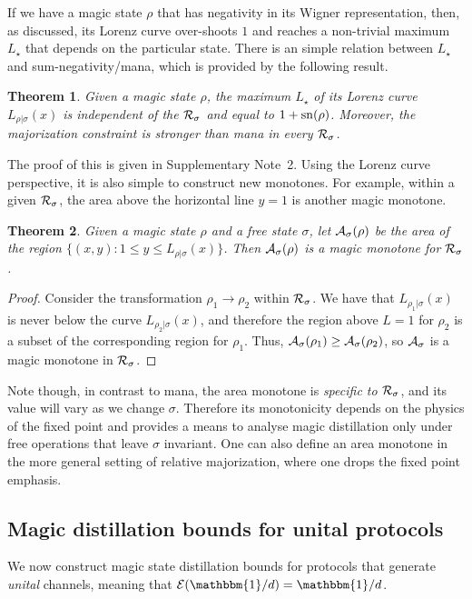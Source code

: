 \documentclass[
onecolumn,
superscriptaddress
]{revtex4-1}
\newtheorem{theorem}{Theorem}
\def\id{\mathbbm{1}}
\def\A{{\cal A}}
\def\E{{\cal E}}
\def\R{{\cal R}}
\begin{document}
If we have a magic state $\rho$ that has negativity in its Wigner representation, then, as discussed, its Lorenz curve over-shoots $1$ and reaches a non-trivial maximum $L_\star$ that depends on the particular state. There is an simple relation between $L_\star$ and sum-negativity/mana, which is provided by the following result. 
\begin{theorem}\label{lem:lcmax}
	Given a magic state $\rho$, the maximum $L_\star$ of its Lorenz curve $L_{\rho|\sigma}(x)$ is independent of the $\R_\sigma$ and equal to $1+{\rm sn}(\rho)$. Moreover, the majorization constraint is stronger than mana in every $\R_\sigma$.
\end{theorem}
The proof of this is given in Supplementary Note~2. Using the Lorenz curve perspective, it is also simple to construct new monotones. For example, within a given $\R_\sigma$, the area above the horizontal line $y = 1$ is another magic monotone.
\begin{theorem}
Given a magic state $\rho$ and a free state $\sigma$, let $\A_\sigma(\rho)$ be the area of the region $\{(x, y): 1 \leq y \leq L_{\rho | \sigma}(x)\}$. Then $\A_\sigma(\rho)$ is a magic monotone for $\R_\sigma$.
\end{theorem}
\begin{proof}
Consider the transformation $\rho_1 \rightarrow \rho_2$ within $\R_\sigma$. We have that $L_{\rho_1|\sigma}(x)$ is never below the curve $L_{\rho_2|\sigma}(x)$, and therefore the region above $L=1$ for $\rho_2$ is a subset of the corresponding region for $\rho_1$. Thus, $\A_\sigma(\rho_1) \geq \A_\sigma(\rho_2)$, so $\A_\sigma$ is a magic monotone in $\R_\sigma$.
\end{proof}
Note though, in contrast to mana, the area monotone is \emph{specific to $\R_\sigma$}, and its value will vary as we change $\sigma$. Therefore its monotonicity depends on the physics of the fixed point and provides a means to analyse magic distillation only under free operations that leave $\sigma$ invariant. One can also define an area monotone in the more general setting of relative majorization, where one drops the fixed point emphasis.

\subsection*{Magic distillation bounds for unital protocols}

We now construct magic state distillation bounds for protocols that generate \emph{unital} channels, meaning that $\E(\id/d) = \id/d$.
\end{document}
